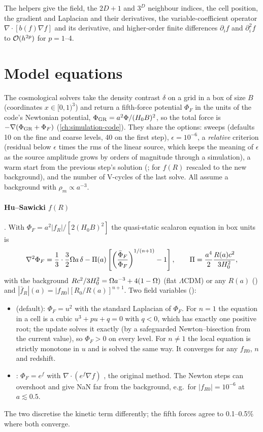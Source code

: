 The helpers give the field, the $2D+1$ and $3^D$ neighbour indices, the cell position, the gradient and Laplacian and
their derivatives, the variable-coefficient operator $\nabla\cdot[b(f)\nabla f]$ and its derivative, and higher-order
finite differences $\partial_if$ and $\partial_i^2f$ to $\mathcal{O}(h^{2p})$ for $p=1$--4.

\section{Model equations}\label{sec:mg-models}

The cosmological solvers take the density contrast $\delta$ on a grid in a box of size $B$ (coordinates $x\in[0,1)^3$) and
return a fifth-force potential $\Phi_F$ in the units of the code's Newtonian potential, $\Phi_{\rm GR}=a^2\Phi/(H_0B)^2$, so the
total force is $-\nabla(\Phi_{\rm GR}+\Phi_F)$ (\cref{ch:simulation-code}). They share the options: sweeps (defaults 10 on the
fine and coarse levels, 40 on the first step), $\epsilon=10^{-6}$, a \emph{relative} criterion (residual below $\epsilon$
times the rms of the linear source, which keeps the meaning of $\epsilon$ as the source amplitude grows by orders of
magnitude through a simulation), a warm start from the previous step's solution (; for $f(R)$ rescaled to the
new background), and the number of V-cycles of the last solve. All assume a background with $\rho_m\propto a^{-3}$.

\paragraph*{Hu--Sawicki $f(R)$} \cite{HuSawicki2007}. With $\Phi_F=a^2|f_R|/[2(H_0B)^2]$ the quasi-static scalaron
equation in box units is
\begin{equation}
\nabla^2\Phi_F=\frac13\cdot\frac32\Omega a\,\delta-\Pi(a)\left[\left(\frac{\bar\Phi_F}{\Phi_F}\right)^{1/(n+1)}-1\right],\qquad
\Pi=\frac{a^4}{2}\frac{R(a)c^2}{3H_0^2},
\end{equation}
with the background $R c^2/3H_0^2=\Omega a^{-3}+4(1-\Omega)$ (flat $\Lambda$CDM) or any $R(a)$ () and
$|\bar f_R|(a)=|f_{R0}|[R_0/R(a)]^{n+1}$. Two field variables ():
\begin{itemize}
\item {} (default): $\Phi_F=u^2$ \cite{Bose2017} with the standard Laplacian of $\Phi_F$. For $n=1$ the equation in
      a cell is a cubic $u^3+pu+q=0$ with $q<0$, which has exactly one positive root; the update solves it exactly (by a
      safeguarded Newton--bisection from the current value), so $\Phi_F>0$ on every level. For $n\ne1$ the local equation is
      strictly monotone in $u$ and is solved the same way. It converges for any $f_{R0}$, $n$ and redshift.
\item {}: $\Phi_F=e^f$ with $\nabla\cdot(e^f\nabla f)$ \cite{Oyaizu2008,Li2012ECOSMOG}, the original method. The Newton
      steps can overshoot and give NaN far from the background, e.g.\ for $|f_{R0}|=10^{-6}$ at $a\lesssim0.5$.
\end{itemize}
The two discretise the kinetic term differently; the fifth forces agree to 0.1--0.5\% where both converge.

